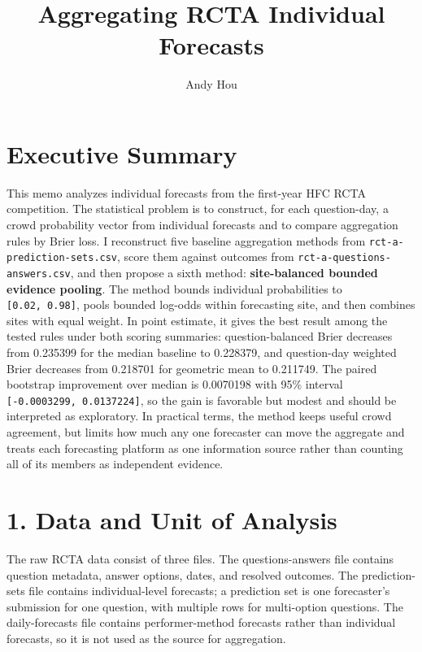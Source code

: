\documentclass[
]{article}
\title{Aggregating RCTA Individual Forecasts}
\author{Andy Hou}
\date{}
\begin{document}
\maketitle

\section{Executive Summary}\label{executive-summary}

This memo analyzes individual forecasts from the first-year HFC RCTA
competition. The statistical problem is to construct, for each
question-day, a crowd probability vector from individual forecasts and
to compare aggregation rules by Brier loss. I reconstruct five baseline
aggregation methods from \texttt{rct-a-prediction-sets.csv}, score them
against outcomes from \texttt{rct-a-questions-answers.csv}, and then
propose a sixth method: \textbf{site-balanced bounded evidence pooling}.
The method bounds individual probabilities to \texttt{{[}0.02,\ 0.98{]}},
pools bounded log-odds within forecasting site, and then combines sites
with equal weight. In point estimate, it gives the best result among the
tested rules under both scoring summaries: question-balanced Brier
decreases from 0.235399 for the median baseline to 0.228379, and
question-day weighted Brier decreases from 0.218701 for geometric mean
to 0.211749. The paired bootstrap improvement over median is 0.0070198
with 95\% interval \texttt{{[}-0.0003299,\ 0.0137224{]}}, so the gain is
favorable but modest and should be interpreted as exploratory. In
practical terms, the method keeps useful crowd agreement, but limits how
much any one forecaster can move the aggregate and treats each
forecasting platform as one information source rather than counting all
of its members as independent evidence.

\section{1. Data and Unit of
Analysis}\label{data-and-unit-of-analysis}

The raw RCTA data consist of three files. The questions-answers file
contains question metadata, answer options, dates, and resolved
outcomes. The prediction-sets file contains individual-level forecasts;
a prediction set is one forecaster's submission for one question, with
multiple rows for multi-option questions. The daily-forecasts file
contains performer-method forecasts rather than individual forecasts, so
it is not used as the source for aggregation.
\end{document}
